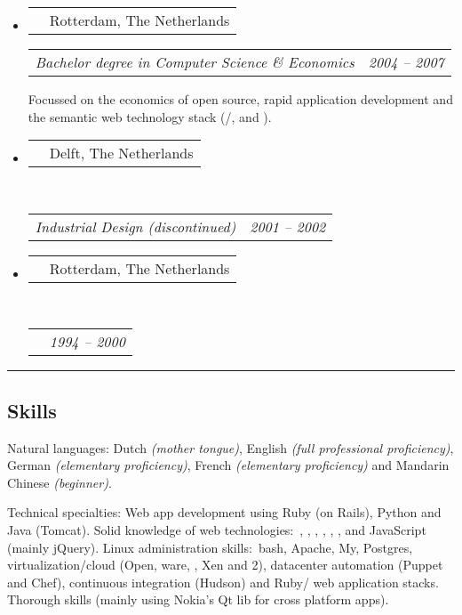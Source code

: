 \documentclass[10pt,a4paper]{article}
\makeatletter
\newenvironment{indentsection}[1]%
{\begin{list}{}%
	{\setlength{\leftmargin}{#1}}%
	\item[]%
}
{\end{list}}
\newcommand{\headerrow}[2]
{\begin{tabular*}{\linewidth}{l@{\extracolsep{\fill}}r}
	\textscale{1.08}{\textbf{#1}} &
	{\sc #2} \\
\end{tabular*}}
\newcommand{\subheaderrow}[2]
{\begin{tabular*}{\linewidth}{l@{\extracolsep{\fill}}r}
	\emph{#1} &
	\emph{#2} \\
\end{tabular*}}
\newcommand{\CPP}
{C\nolinebreak[4]\hspace{-.04em}\raisebox{.20ex}{\footnotesize\bf ++}}
\makeatother
\begin{document}
\begin{itemize}
	\parskip=0.1em

	\item
	\headerrow
		{Erasmus University Rotterdam}
		{Rotterdam, The Netherlands}
	\subheaderrow
		{Bachelor degree in Computer Science \& Economics}
		{2004 -- 2007}
  Focussed on the economics of open source, rapid application development and the semantic web technology stack (/,  and ).

  \item
	\headerrow
		{Technical University Delft}
		{Delft, The Netherlands}
	\\
	\subheaderrow
		{Industrial Design (discontinued)}
		{2001 -- 2002}

	\item
	\headerrow
		{Libanon Lyceum}
		{Rotterdam, The Netherlands}
	\\
	\subheaderrow
		{\textscale{.85}{VWO}}
		{1994 -- 2000}

\end{itemize}


\hrule
\vspace{-0.4em}
\subsection*{Skills}

\begin{indentsection}{\parindent}
\begin{description*}
	\item[Natural languages:]
  Dutch \emph{(mother tongue)}, English \emph{(full professional proficiency)}, German \emph{(elementary proficiency)}, French \emph{(elementary proficiency)} and Mandarin Chinese \emph{(beginner)}.
\end{description*}
\end{indentsection}

\begin{indentsection}{\parindent}
\begin{description*}
	\item[Technical specialties:]
  Web app development using Ruby (on Rails), Python and Java (Tomcat). Solid know\-ledge of web technologies:\ , , , , , ,  and JavaScript (mainly jQuery). Linux administration skills:\ bash, Apache, My, Postgres, virtualization/cloud (Open, ware, , Xen and 2), datacenter automation (Puppet and Chef), continuous integration (Hudson) and Ruby/\linebreak[0] web application stacks. Thorough \textscale{.85}{\CPP} skills (mainly using Nokia's Qt lib for cross platform  apps).
\end{description*}
\end{indentsection}
\end{document}

